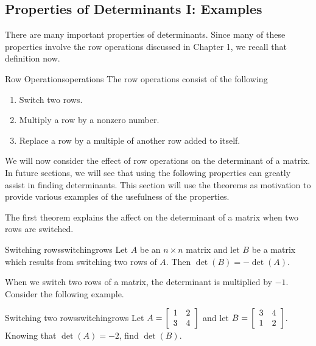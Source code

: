 \subsection{Properties of Determinants I: Examples}

There are many important properties of determinants. Since many of these properties involve
the row operations discussed in Chapter 1, we recall that definition now. 

\begin{definition}{Row Operations}{operations}
The row operations
consist of the following

\begin{enumerate}
\item Switch two rows.

\item Multiply a row by a nonzero number.

\item Replace a row by a multiple of another row added to itself.
\end{enumerate}
\end{definition}

We will now consider the effect of row operations on the determinant of a matrix. In future sections, we will see that using the following properties can 
greatly assist in finding determinants. This section will use the theorems as motivation to provide various examples of the usefulness of the properties. 

The first theorem explains the affect on the determinant of a matrix when two rows are switched. 

\begin{theorem}{Switching rows}{switchingrows}
Let $A$ be an $n\times n$ matrix and let $B$ be a matrix
which results from switching two rows of $A.$ Then $\det \left( B\right)
= - \det \left( A\right) .$ 
\end{theorem}

When we switch two rows of a matrix, the determinant is multiplied by $-1$. Consider the following example.

\begin{example}{Switching two rows}{switchingrows}
Let $A=\left[
\begin{array}{rr}
1 & 2 \\
3 & 4
\end{array}
\right] $ and let $B=\left[
\begin{array}{rr}
3 & 4 \\
1 & 2
\end{array}
\right] $. 
Knowing that $\det \left( A \right) =-2$, find $\det \left( B \right) $.
\end{example}

